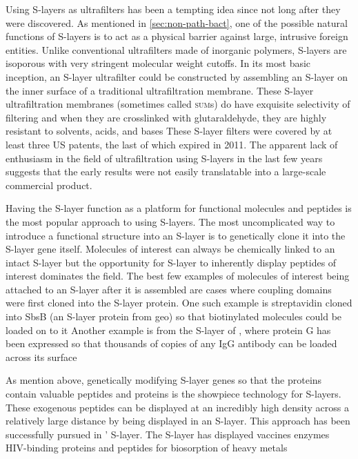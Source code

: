   Using \acp{S-layer} as ultrafilters has been a tempting idea since not long after they were discovered. As mentioned in \cref{sec:non-path-bact}, one of the possible natural
functions of \acp{S-layer} is to act as a physical barrier against large, intrusive foreign entities. Unlike conventional ultrafilters made of inorganic polymers, \acp{S-layer} are
isoporous with very stringent molecular weight cutoffs. In its most basic inception, an \ac{S-layer} ultrafilter could be constructed by assembling an \ac{S-layer} on the inner
surface of a traditional ultrafiltration membrane. These \ac{S-layer} ultrafiltration membranes (sometimes called \textsc{sum}s) do have exquisite selectivity of filtering and when
they are crosslinked with glutaraldehyde, they are highly resistant to solvents, acids, and bases These \ac{S-layer} filters were covered by at least
three US patents, the last of which expired in 2011. The apparent lack of enthusiasm in the field of ultrafiltration using \acp{S-layer} in the last few years suggests that the
early results were not easily translatable into a large-scale commercial product.
  
 Having the \ac{S-layer} function as a platform for functional molecules and peptides is the most popular approach to using \acp{S-layer}. The most uncomplicated way to introduce
a functional structure into an \ac{S-layer} is to genetically clone it into the \ac{S-layer} gene itself. Molecules of interest can always be chemically linked to an intact
\ac{S-layer} but the opportunity for \ac{S-layer} to inherently display peptides of interest dominates the field. The best few examples of molecules
of interest being attached to an \ac{S-layer} after it is assembled are cases where coupling domains were first cloned into the \ac{S-layer} protein. One such example is
streptavidin cloned into SbsB (an \ac{S-layer} protein from \ac{geo}) so that biotinylated molecules could be loaded on to it Another example is from the
\ac{S-layer} of \caulobacter{}, where protein G has been expressed so that thousands of copies of any IgG antibody can be loaded across its surface

  As mention above, genetically modifying \ac{S-layer} genes so that the proteins contain valuable peptides and proteins is the showpiece technology for \acp{S-layer}. These
exogenous peptides can be displayed at an incredibly high density across a relatively large distance by being displayed in an \ac{S-layer}. This approach has been successfully
pursued in \caulobacter{}' \ac{S-layer}. The \caulobacter{} \ac{S-layer} has displayed vaccines enzymes HIV-binding
proteins and peptides for biosorption of heavy metals


